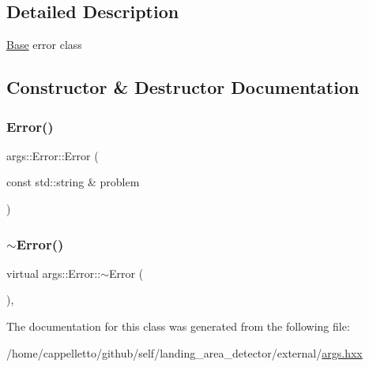 \subsection{Detailed Description}
\hyperlink{classargs_1_1_base}{Base} error class 

\subsection{Constructor \& Destructor Documentation}
\mbox{\label{classargs_1_1_error_a09eff0dde2175ef1645a30ff7e93b9b0}} 
\subsubsection{\texorpdfstring{Error()}{Error()}}
{\footnotesize\ttfamily args\+::\+Error\+::\+Error (\begin{DoxyParamCaption}\item[{const std\+::string \&}]{problem }\end{DoxyParamCaption})\hspace{0.3cm}{\ttfamily [inline]}}

\mbox{\label{classargs_1_1_error_aab8f2900dca29d20c3d84d89b40d9ccb}} 
\subsubsection{\texorpdfstring{$\sim$\+Error()}{~Error()}}
{\footnotesize\ttfamily virtual args\+::\+Error\+::$\sim$\+Error (\begin{DoxyParamCaption}{ }\end{DoxyParamCaption})\hspace{0.3cm}{\ttfamily [inline]}, {\ttfamily [virtual]}}



The documentation for this class was generated from the following file\+:\begin{DoxyCompactItemize}
\item 
/home/cappelletto/github/self/landing\+\_\+area\+\_\+detector/external/\hyperlink{args_8hxx}{args.\+hxx}\end{DoxyCompactItemize}
